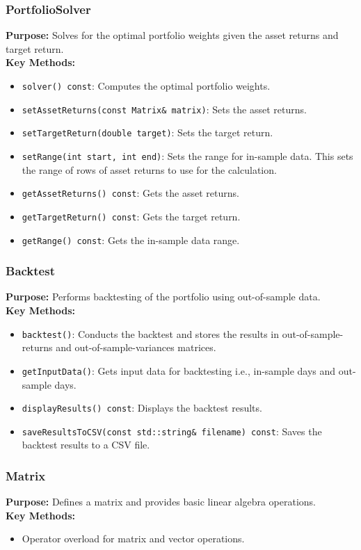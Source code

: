 \documentclass[12pt,twoside]{article}
\begin{document}
\subsubsection{PortfolioSolver}
\textbf{Purpose:} Solves for the optimal portfolio weights given the asset returns and target return.\\
\textbf{Key Methods:}
\begin{itemize}[nosep]
    \item \texttt{solver() const}: Computes the optimal portfolio weights.
    \item \texttt{setAssetReturns(const Matrix\& matrix)}: Sets the asset returns.
    \item \texttt{setTargetReturn(double target)}: Sets the target return.
    \item \texttt{setRange(int start, int end)}: Sets the range for in-sample data. This sets the range of rows of asset returns to use for the calculation.
    \item \texttt{getAssetReturns() const}: Gets the asset returns.
    \item \texttt{getTargetReturn() const}: Gets the target return.
    \item \texttt{getRange() const}: Gets the in-sample data range.
\end{itemize}

\subsubsection{Backtest}
\textbf{Purpose:} Performs backtesting of the portfolio using out-of-sample data.\\
\textbf{Key Methods:}
\begin{itemize}[nosep]
    \item \texttt{backtest()}: Conducts the backtest and stores the results in out-of-sample-returns and out-of-sample-variances matrices.
    \item \texttt{getInputData()}: Gets input data for backtesting i.e., in-sample days and out-sample days.
    \item \texttt{displayResults() const}: Displays the backtest results.
    \item \texttt{saveResultsToCSV(const std::string\& filename) const}: Saves the backtest results to a CSV file.
\end{itemize}


\subsubsection{Matrix}
\textbf{Purpose:} Defines a matrix and provides basic linear algebra operations.\\
\textbf{Key Methods:}
\begin{itemize}[nosep]
    \item Operator overload for matrix and vector operations.
\end{itemize}
\end{document}
